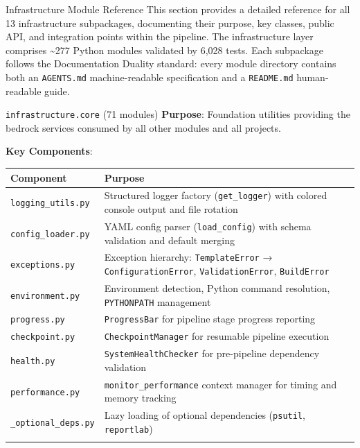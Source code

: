\documentclass[
  ignorenonframetext,
]{beamer}
\author{\texorpdfstring{}{}}
\date{}
\newcounter{none} %
\begin{document}
\begin{frame}[fragile]{Infrastructure Module Reference}
\protect{}\label{infrastructure-module-reference}
This section provides a detailed reference for all 13 infrastructure
subpackages, documenting their purpose, key classes, public API, and
integration points within the pipeline. The infrastructure layer
comprises \textasciitilde277 Python modules validated by 6,028 tests.
Each subpackage follows the Documentation Duality standard: every module
directory contains both an \texttt{AGENTS.md} machine-readable
specification and a \texttt{README.md} human-readable guide.

\begin{block}{\texttt{infrastructure.core} (71 modules)}
\protect{}\label{infrastructure.core-71-modules}
\textbf{Purpose}: Foundation utilities providing the bedrock services
consumed by all other modules and all projects.

\textbf{Key Components}:

{\def\LTcaptype{none} %
\begin{longtable}[]{@{}
  >{\raggedright\arraybackslash}p{}
  >{\raggedright\arraybackslash}p{}@{}}
\toprule\noalign{}
\begin{minipage}[b]{\linewidth}\raggedright
Component
\end{minipage} & \begin{minipage}[b]{\linewidth}\raggedright
Purpose
\end{minipage} \\
\midrule\noalign{}
\endhead
\texttt{logging\_utils.py} & Structured logger factory
(\texttt{get\_logger}) with colored console output and file rotation \\
\texttt{config\_loader.py} & YAML config parser (\texttt{load\_config})
with schema validation and default merging \\
\texttt{exceptions.py} & Exception hierarchy: \texttt{TemplateError} →
\texttt{ConfigurationError}, \texttt{ValidationError},
\texttt{BuildError} \\
\texttt{environment.py} & Environment detection, Python command
resolution, \texttt{PYTHONPATH} management \\
\texttt{progress.py} & \texttt{ProgressBar} for pipeline stage progress
reporting \\
\texttt{checkpoint.py} & \texttt{CheckpointManager} for resumable
pipeline execution \\
\texttt{health.py} & \texttt{SystemHealthChecker} for pre-pipeline
dependency validation \\
\texttt{performance.py} & \texttt{monitor\_performance} context manager
for timing and memory tracking \\
\texttt{\_optional\_deps.py} & Lazy loading of optional dependencies
(\texttt{psutil}, \texttt{reportlab}) \\
\bottomrule\noalign{}
\end{longtable}
}


\end{block}
\end{frame}
\end{document}
